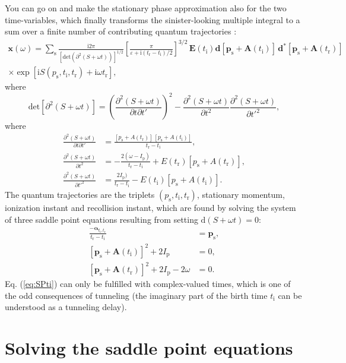 \documentclass[10pt]{article}
\newcommand{\rmi}{\mathrm i}
\newcommand{\ti}{t_\rmi}
\newcommand{\tr}{t_\mathrm{r}}
\newcommand{\rmd}{\mathrm d}
\newcommand{\Ip}{I_{\mathrm p}}
\newcommand{\ps}{p_{\mathrm s}}
\begin{document}
You can go on and make the stationary phase approximation also for the two time-variables, which finally transforms the  sinister-looking multiple integral to a sum over a finite number of contributing quantum trajectories \cite{Lewenstein1995Rings,Lewenstein1995,Sansone2004nonadiabatic}:
\begin{multline}
	 \mathbf{x}(\omega) = \sum_\mathrm{s} \frac{\rmi2\pi}{\left[\mathrm{det}(\partial^2(S+\omega t))\right]^{1/2} }  \left[ \frac{\pi}{\varepsilon + \rmi(\tr-\ti)/2} \right]^{3/2}  \,\mathbf{E}(\ti) \mathbf{d}[\mathbf{\ps}+\mathbf{A}(\ti)]\,\mathbf{d}^* [\mathbf{\ps}+\mathbf{A}(\tr)] \\
	\times  \exp[\rmi S(\ps,\ti,\tr) + \rmi\omega\tr], 
\end{multline}
where 
\begin{equation}
	\mathrm{det}[\partial^2(S+\omega t)]= \left( \frac{\partial^2(S+\omega t)}{\partial t\partial t'}  \right)^2 - \frac{\partial^2(S+\omega t)}{\partial t^2}\frac{\partial^2(S+\omega t)}{\partial t'^2},
\end{equation}
where
\begin{align}
	\frac{\partial^2(S+\omega t)}{\partial t\partial t'}& = \frac{[\ps + A(\tr)]\,[\ps + A(\ti)]}{\tr-\ti},\\
	\frac{\partial^2(S+\omega t)}{\partial t^2}	& = -\frac{2(\omega-\Ip)}{\tr-\ti} + E(\tr)[\ps + A(\tr)],\\
	\frac{\partial^2(S+\omega t)}{\partial t'^2}	& = \frac{2\Ip)}{\tr-\ti} - E(\ti)[\ps + A(\ti)].
\end{align}
The quantum trajectories are the triplets $(\ps,\ti,\tr)$, stationary momentum, ionization instant and recollision instant, which are found by solving the system of three saddle point equations resulting from setting $\rmd (S+\omega t) = 0$:
\begin{align}
	\frac{-\bm{\alpha}_{\ti,\tr}}{\tr-\ti}& = \mathbf{\ps},  \label{eq:SPp}\\
	[\mathbf{\ps}+\mathbf{A}(\ti)]^2 + 2\Ip & =0,\label{eq:SPti}\\
	[\mathbf{\ps}+\mathbf{A}(\tr)]^2 + 2\Ip -2\omega& =0. \label{eq:SPtr}
\end{align}
Eq. (\ref{eq:SPti}) can only be fulfilled with complex-valued times, which is one of the odd consequences of tunneling (the imaginary part of the birth time $\ti$ can be understood as a tunneling delay).

\section{Solving the saddle point equations}
\end{document}
